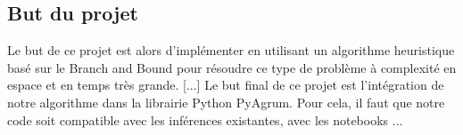 \documentclass[12pt]{article}
\begin{document}
\subsection{But du projet}
Le but de ce projet est alors d'implémenter en utilisant un algorithme heuristique basé sur le Branch and Bound pour résoudre ce type de problème à complexité en espace et en temps très grande. %
[...]
Le but final de ce projet est l'intégration de notre algorithme dans la librairie Python PyAgrum. Pour cela, il faut que notre code soit compatible avec les inférences existantes, avec les notebooks ...
\end{document}
